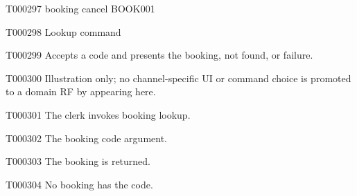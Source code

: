 \documentclass[11pt,a4paper]{article}
\begin{document}
\begin{atlascode}{T000297}
booking cancel BOOK001
\end{atlascode}
\begin{atlastext}{T000298}
Lookup command
\end{atlastext}
\begin{atlasparagraph}{T000299}
Accepts a code and presents the booking, not found, or failure.
\end{atlasparagraph}
\begin{atlasparagraph}{T000300}
Illustration only; no channel-specific UI or command choice is promoted to a domain RF by appearing here.
\end{atlasparagraph}
\begin{atlasparagraph}{T000301}
The clerk invokes booking lookup.
\end{atlasparagraph}
\begin{atlasparagraph}{T000302}
The booking code argument.
\end{atlasparagraph}
\begin{atlasparagraph}{T000303}
The booking is returned.
\end{atlasparagraph}
\begin{atlasparagraph}{T000304}
No booking has the code.
\end{atlasparagraph}
\end{document}
